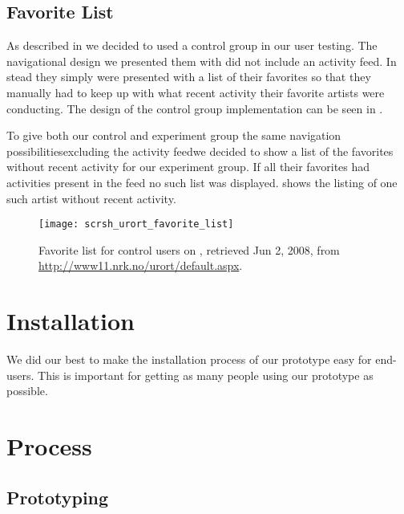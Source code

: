 \subsection{Favorite List}
\label{section:implementation.design.favorite.list}

As described in
we decided to used a control group in our user testing. The navigational
design we presented them with did not include an activity feed. In stead they
simply were presented with a list of their favorites so that they manually had
to keep up with what recent activity their favorite artists were conducting.
The design of the control group implementation can be seen in
.

To give both our control and experiment group the same navigation
possibilities\dash{}excluding the activity feed\dash{}we decided to show a
list of the favorites without recent activity for our experiment group. If all
their favorites had activities present in the feed no such list was displayed.
 shows the listing of one such artist
without recent activity.

\begin{figure}
  \centering
  \texttt{[image: scrsh\_urort\_favorite\_list]}
  \caption[\urort{} Favorite List]{
    Favorite list for control users on \urort{},
    retrieved Jun 2, 2008, from
    \url{http://www11.nrk.no/urort/default.aspx}.
  }
  \label{figure:scrsh.urort.favorite.list}
\end{figure}

\section{Installation}

We did our best to make the installation process of our prototype easy
for end-users. This is important for getting as many people using our
prototype as possible.


\section{Process}

\subsection{Prototyping}

